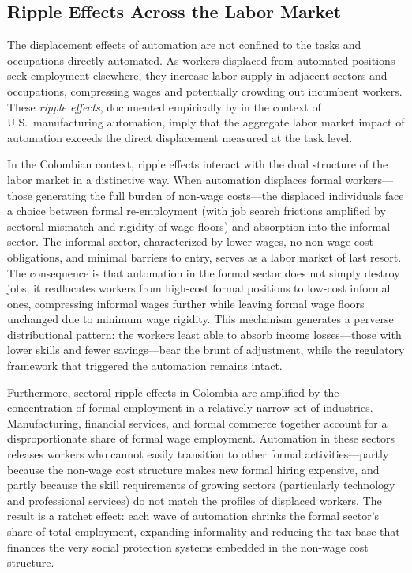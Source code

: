 \subsection{Ripple Effects Across the Labor Market}
\label{subsec:ripples}

The displacement effects of automation are not confined to the tasks and occupations directly automated. As workers displaced from automated positions seek employment elsewhere, they increase labor supply in adjacent sectors and occupations, compressing wages and potentially crowding out incumbent workers. These \textit{ripple effects}, documented empirically by \cite{acemoglu2020robots} in the context of U.S.\ manufacturing automation, imply that the aggregate labor market impact of automation exceeds the direct displacement measured at the task level.

In the Colombian context, ripple effects interact with the dual structure of the labor market in a distinctive way. When automation displaces formal workers---those generating the full burden of non-wage costs---the displaced individuals face a choice between formal re-employment (with job search frictions amplified by sectoral mismatch and rigidity of wage floors) and absorption into the informal sector. The informal sector, characterized by lower wages, no non-wage cost obligations, and minimal barriers to entry, serves as a labor market of last resort. The consequence is that automation in the formal sector does not simply destroy jobs; it reallocates workers from high-cost formal positions to low-cost informal ones, compressing informal wages further while leaving formal wage floors unchanged due to minimum wage rigidity. This mechanism generates a perverse distributional pattern: the workers least able to absorb income losses---those with lower skills and fewer savings---bear the brunt of adjustment, while the regulatory framework that triggered the automation remains intact.

Furthermore, sectoral ripple effects in Colombia are amplified by the concentration of formal employment in a relatively narrow set of industries. Manufacturing, financial services, and formal commerce together account for a disproportionate share of formal wage employment. Automation in these sectors releases workers who cannot easily transition to other formal activities---partly because the non-wage cost structure makes new formal hiring expensive, and partly because the skill requirements of growing sectors (particularly technology and professional services) do not match the profiles of displaced workers. The result is a ratchet effect: each wave of automation shrinks the formal sector's share of total employment, expanding informality and reducing the tax base that finances the very social protection systems embedded in the non-wage cost structure.


